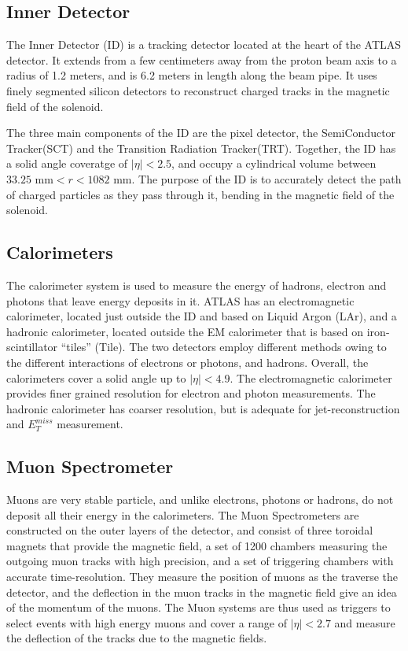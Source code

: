 \documentclass[11pt,a4paper,openright,twoside]{report}
\newcommand{\met}{$E_T^{miss}$ }
\begin{document}
\subsection{Inner Detector}

The Inner Detector (ID) \cite{inner_detector} is a tracking detector located at the heart of the ATLAS detector. It extends from a few centimeters away from the proton beam axis to a radius of 1.2 meters, and is 6.2 meters in length along the beam pipe. It uses finely segmented silicon detectors to reconstruct charged tracks in the magnetic field of the solenoid.

The three main components of the ID are the pixel detector, the SemiConductor Tracker(SCT) and the Transition Radiation Tracker(TRT). Together, the ID has a solid angle coveratge of $|\eta|<2.5$, and occupy a cylindrical volume between $33.25\text{ mm} < r<1082\text{ mm}$. The purpose of the ID is to accurately detect the path of charged particles as they pass through it, bending in the magnetic field of the solenoid.

\subsection{Calorimeters}
The calorimeter system is used to measure the energy of hadrons, electron and photons that leave energy deposits in it. ATLAS has an electromagnetic calorimeter, located just outside the ID and based on Liquid Argon (LAr), and a hadronic calorimeter, located outside the EM calorimeter that is based on iron-scintillator ``tiles'' (Tile). The two detectors employ different methods owing to the different interactions of electrons or photons, and hadrons. Overall, the calorimeters cover a solid angle up to $|\eta|<4.9$. The electromagnetic calorimeter provides finer grained resolution for electron and photon measurements. The hadronic calorimeter has coarser resolution, but is adequate for jet-reconstruction and \met measurement.

\subsection{Muon Spectrometer}
Muons are very stable particle, and unlike electrons, photons or hadrons, do not deposit all their energy in the calorimeters. The Muon Spectrometers are constructed on the outer layers of the detector, and consist of three toroidal magnets that provide the magnetic field, a set of 1200 chambers measuring the outgoing muon tracks with high precision, and a set of triggering chambers with accurate time-resolution. They measure the position of muons as the traverse the detector, and the deflection in the muon tracks in the magnetic field give an idea of the momentum of the muons. The Muon systems are thus used as triggers to select events with high energy muons and cover a range of $|\eta|<2.7$ and measure the deflection of the tracks due to the magnetic fields. 
\end{document}
